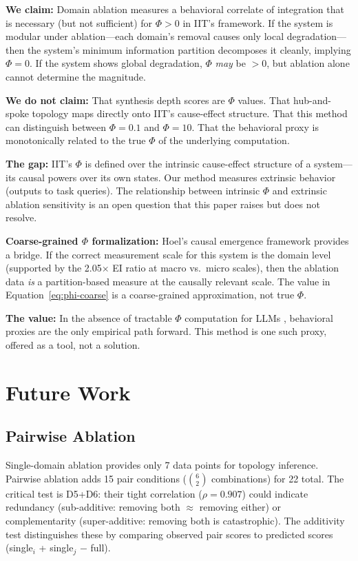 \documentclass[12pt,letterpaper]{article}
\begin{document}
\textbf{We claim:} Domain ablation measures a behavioral correlate of integration that is necessary (but not sufficient) for $\Phi > 0$ in IIT's framework. If the system is modular under ablation---each domain's removal causes only local degradation---then the system's minimum information partition decomposes it cleanly, implying $\Phi = 0$. If the system shows global degradation, $\Phi$ \emph{may} be $> 0$, but ablation alone cannot determine the magnitude.

\textbf{We do not claim:} That synthesis depth scores are $\Phi$ values. That hub-and-spoke topology maps directly onto IIT's cause-effect structure. That this method can distinguish between $\Phi = 0.1$ and $\Phi = 10$. That the behavioral proxy is monotonically related to the true $\Phi$ of the underlying computation.

\textbf{The gap:} IIT's $\Phi$ is defined over the intrinsic cause-effect structure of a system---its causal powers over its own states. Our method measures extrinsic behavior (outputs to task queries). The relationship between intrinsic $\Phi$ and extrinsic ablation sensitivity is an open question that this paper raises but does not resolve.

\textbf{Coarse-grained $\Phi$ formalization:} Hoel's causal emergence framework \citep{hoel2017map, hoel2025ce2} provides a bridge. If the correct measurement scale for this system is the domain level (supported by the 2.05$\times$ EI ratio at macro vs.\ micro scales), then the ablation data \emph{is} a partition-based measure at the causally relevant scale. The value in Equation~\ref{eq:phi-coarse} is a coarse-grained approximation, not true $\Phi$.

\textbf{The value:} In the absence of tractable $\Phi$ computation for LLMs \citep{krohn2025nphard}, behavioral proxies are the only empirical path forward. This method is one such proxy, offered as a tool, not a solution.

\section{Future Work}
\label{sec:future}

\subsection{Pairwise Ablation}

Single-domain ablation provides only 7 data points for topology inference. Pairwise ablation adds 15 pair conditions ($\binom{6}{2}$ combinations) for 22 total. The critical test is D5+D6: their tight correlation ($\rho = 0.907$) could indicate redundancy (sub-additive: removing both $\approx$ removing either) or complementarity (super-additive: removing both is catastrophic). The additivity test distinguishes these by comparing observed pair scores to predicted scores (single$_i$ + single$_j$ $-$ full).
\end{document}
